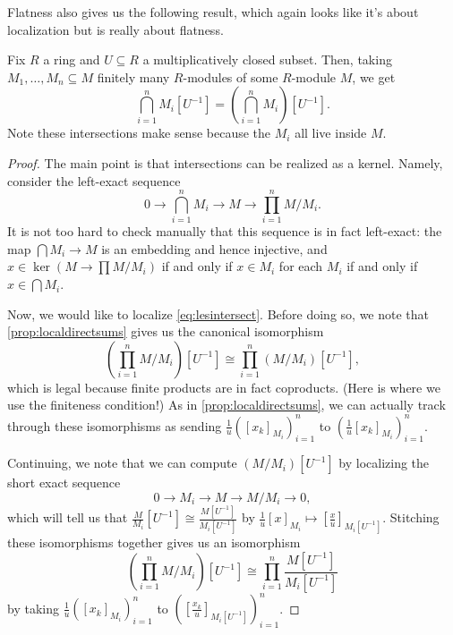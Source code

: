 Flatness also gives us the following result, which again looks like it's about localization but is really about flatness.
\begin{corollary} \label{lem:localizeintersection}
	Fix $R$ a ring and $U\subseteq R$ a multiplicatively closed subset. Then, taking $M_1,\ldots,M_n\subseteq M$ finitely many $R$-modules of some $R$-module $M$, we get
	\[\bigcap_{i=1}^nM_i\left[U^{-1}\right]=\left(\bigcap_{i=1}^nM_i\right)\left[U^{-1}\right].\]
	Note these intersections make sense because the $M_i$ all live inside $M$.
\end{corollary}
\begin{proof}
	The main point is that intersections can be realized as a kernel. Namely, consider the left-exact sequence
	\[0\to\bigcap_{i=1}^nM_i\to M\to\prod_{i=1}^nM/M_i.\tag{$*$}\label{eq:lesintersect}\]
	It is not too hard to check manually that this sequence is in fact left-exact: the map $\bigcap M_i\to M$ is an embedding and hence injective, and $x\in\ker\left(M\to\prod M/M_i\right)$ if and only if $x\in M_i$ for each $M_i$ if and only if $x\in\bigcap M_i$.
	
	Now, we would like to localize \autoref{eq:lesintersect}. Before doing so, we note that \autoref{prop:localdirectsums} gives us the canonical isomorphism
	\[\left(\prod_{i=1}^nM/M_i\right)[U^{-1}]\cong\prod_{i=1}^n(M/M_i)\left[U^{-1}\right],\]
	which is legal because finite products are in fact coproducts. (Here is where we use the finiteness condition!) As in \autoref{prop:localdirectsums}, we can actually track through these isomorphisms as sending $\frac1u([x_k]_{M_i})_{i=1}^n$ to $\left(\frac1u[x_k]_{M_i}\right)_{i=1}^n$.
	
	Continuing, we note that we can compute $(M/M_i)\left[U^{-1}\right]$ by localizing the short exact sequence
	\[0\to M_i\to M\to M/M_i\to 0,\]
	which will tell us that $\frac M{M_i}\left[U^{-1}\right]\cong\frac{M\left[U^{-1}\right]}{M_i\left[U^{-1}\right]}$ by $\frac1u[x]_{M_i}\mapsto\left[\frac xu\right]_{M_i\left[U^{-1}\right]}$. Stitching these isomorphisms together gives us an isomorphism
	\[\left(\prod_{i=1}^nM/M_i\right)[U^{-1}]\cong\prod_{i=1}^n\frac{M\left[U^{-1}\right]}{M_i\left[U^{-1}\right]}\]
	by taking $\frac1u\left([x_k]_{M_i}\right)_{i=1}^n$ to $\left([\frac{x_k}u]_{M_i\left[U^{-1}\right]}\right)_{i=1}^n$.


\end{proof}
